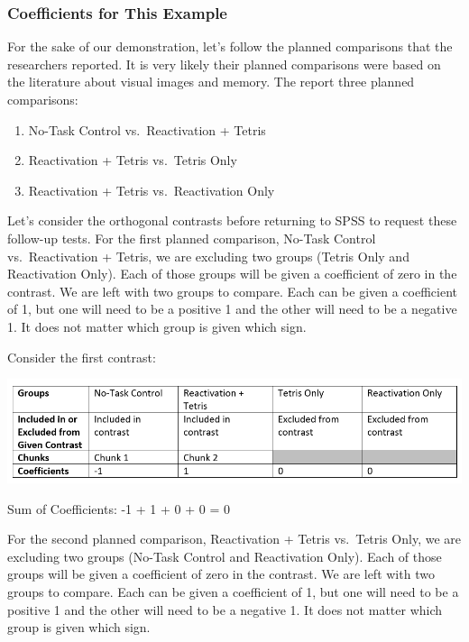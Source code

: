 \documentclass[
]{book}
\begin{document}
\hypertarget{coefficients-for-this-example}{%
\subsubsection{Coefficients for This Example}\label{coefficients-for-this-example}}

For the sake of our demonstration, let's follow the planned comparisons that the researchers reported. It is very likely their planned comparisons were based on the literature about visual images and memory. The report three planned comparisons:

\begin{enumerate}
\def\labelenumi{\arabic{enumi})}
\item
  No-Task Control vs.~Reactivation + Tetris
\item
  Reactivation + Tetris vs.~Tetris Only
\item
  Reactivation + Tetris vs.~Reactivation Only
\end{enumerate}

Let's consider the orthogonal contrasts before returning to SPSS to request these follow-up tests.
For the first planned comparison, No-Task Control vs.~Reactivation + Tetris, we are excluding two groups (Tetris Only and Reactivation Only). Each of those groups will be given a coefficient of zero in the contrast. We are left with two groups to compare. Each can be given a coefficient of 1, but one will need to be a positive 1 and the other will need to be a negative 1. It does not matter which group is given which sign.

Consider the first contrast:

\includegraphics{img/8.6.3.19.png}

Sum of Coefficients: -1 + 1 + 0 + 0 = 0

For the second planned comparison, Reactivation + Tetris vs.~Tetris Only, we are excluding two groups (No-Task Control and Reactivation Only). Each of those groups will be given a coefficient of zero in the contrast. We are left with two groups to compare. Each can be given a coefficient of 1, but one will need to be a positive 1 and the other will need to be a negative 1. It does not matter which group is given which sign.
\end{document}
